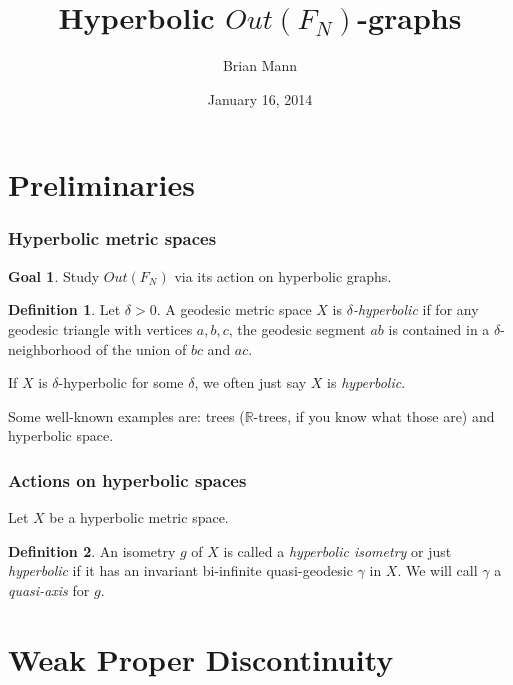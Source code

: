 \documentclass{beamer}
\title{Hyperbolic $Out(F_N)$-graphs}
\author{Brian Mann}
\institute{University of Utah}
\date{January 16, 2014}
\theoremstyle{theorem}
\theoremstyle{definition}
\newtheorem*{defin}{Definition}
\newtheorem*{goal}{Goal}
\newcommand{\R}{\ensuremath{\mathbb R}}
\renewcommand{\-}{\ensuremath{^{-1}}}
\renewcommand{\>}{\ensuremath{\rightarrow}}
\renewcommand{\(}{\langle}
\renewcommand{\)}{\rangle}
\begin{document}
\begin{frame}
\titlepage
\end{frame}



\section{Preliminaries}



\begin{frame}
\frametitle{Hyperbolic metric spaces}

\begin{goal}
Study $Out(F_N)$ via its action on hyperbolic graphs.
\end{goal}

\pause

\begin{defin}
Let $\delta > 0$. A geodesic metric space $X$ is \emph{$\delta$-hyperbolic} if for any geodesic triangle with vertices $a,b,c$, the geodesic segment $ab$ is contained in a $\delta$-neighborhood of the union of $bc$ and $ac$.

If $X$ is $\delta$-hyperbolic for some $\delta$, we often just say $X$ is \emph{hyperbolic}. 
\end{defin}

\pause

Some well-known examples are: trees ($\R$-trees, if you know what those are) and hyperbolic space.
\end{frame}

\begin{frame}
\frametitle{Actions on hyperbolic spaces}
Let $X$ be a hyperbolic metric space.
\pause
\begin{defin}
An isometry $g$ of $X$ is called a \emph{hyperbolic isometry} or just \emph{hyperbolic} if it has an invariant bi-infinite quasi-geodesic $\gamma$ in $X$. We will call $\gamma$ a \emph{quasi-axis} for $g$.
\end{defin}
\pause
\end{frame}

\section{Weak Proper Discontinuity}
\end{document}
